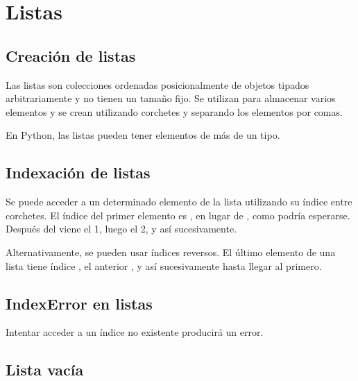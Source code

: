 \chapter{Listas}

\section{Creación de listas}

Las listas son colecciones ordenadas posicionalmente de objetos tipados arbitrariamente y no tienen un tamaño fijo. Se utilizan para almacenar varios elementos y se crean utilizando corchetes y separando los elementos por comas.


En Python, las listas pueden tener elementos de más de un tipo.


\section{Indexación de listas}

Se puede acceder a un determinado elemento de la lista utilizando su índice entre corchetes. El índice del primer elemento es , en lugar de , como podría esperarse. Después del  viene el {1}, luego el {2}, y así sucesivamente.


Alternativamente, se pueden usar índices reversos. El último elemento de una lista tiene índice , el anterior , y así sucesivamente hasta llegar al primero.


\section{IndexError en listas}

Intentar acceder a un índice no existente producirá un error.


\section{Lista vacía}

